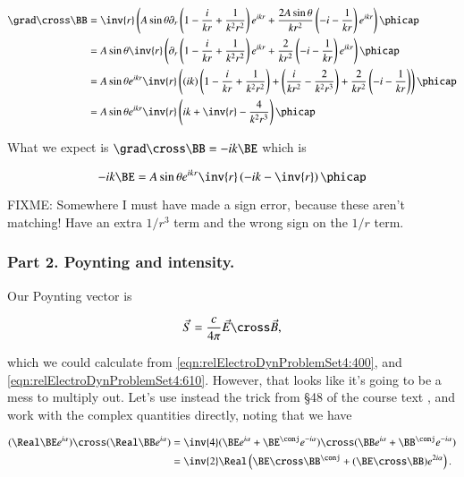 \begin{align*}
\grad \cross \BB 
&=
\inv{r } \left(
 A\sin\theta 
\partial_r \left( 1 - \frac{i}{k r} + \frac{1}{k^2 r^2} \right) e^{i k r} 
+\frac{2 A \sin\theta}{k r^2} 
\left( -i - \frac{1}{k r} \right) e^{i k r} 
\right) \phicap \\
&=
A \sin\theta 
\inv{r } \left(
\partial_r \left( 1 - \frac{i}{k r} + \frac{1}{k^2 r^2} \right) e^{i k r} 
+\frac{2 }{k r^2} 
\left( -i - \frac{1}{k r} \right) e^{i k r} 
\right) \phicap \\
&=
A \sin\theta e^{i k r}
\inv{r } \left(
(ik)\left( 1 - \frac{i}{k r} + \frac{1}{k^2 r^2} \right) 
+\left( \frac{i}{k r^2} - \frac{2}{k^2 r^3} \right) 
+\frac{2 }{k r^2} 
\left( -i - \frac{1}{k r} \right) 
\right) \phicap \\
&=
A \sin\theta e^{i k r}
\inv{r } \left(
i k + \inv{r} - \frac{ 4 }{k^2 r^3}
\right) \phicap \\
\end{align*}

What we expect is $\grad \cross \BB = - i k \BE$ which is

\begin{equation}\label{eqn:relElectroDynProblemSet4:640}
- i k \BE =
A \sin\theta e^{i k r}
\inv{r } \left(
- i k - \inv{r}
\right) \phicap 
\end{equation}

FIXME: Somewhere I must have made a sign error, because these aren't matching!  Have an extra $1/r^3$ term and the wrong sign on the $1/r$ term.

\subsubsection{Part 2.  Poynting and intensity.}

Our Poynting vector is

\begin{equation}\label{eqn:relElectroDynProblemSet4:650}
\vec{S} = \frac{c}{4 \pi} \vec{E} \cross \vec{B},
\end{equation}

which we could calculate from \ref{eqn:relElectroDynProblemSet4:400}, and \ref{eqn:relElectroDynProblemSet4:610}.  However, that looks like it's going to be a mess to multiply out.  Let's use instead the trick from \S 48 of the course text \cite{landau1980classical}, and work with the complex quantities directly, noting that we have

\begin{align*}
(\Real \BE e^{i \alpha}) \cross (\Real \BB e^{i \alpha}) 
&= \inv{4} 
( \BE e^{i \alpha} + \BE^\conj e^{-i \alpha}) \cross ( \BB e^{i \alpha} + \BB^\conj e^{-i \alpha}) \\
&= \inv{2} \Real \left( \BE \cross \BB^\conj + (\BE \cross \BB) e^{2 i \alpha} \right).
\end{align*}

